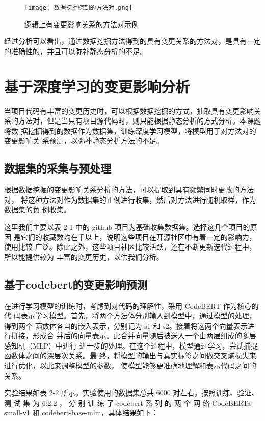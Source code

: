 \begin{figure}[h]
\centering
\texttt{[image: 数据挖掘挖到的方法对.png]}
\caption{逻辑上有变更影响关系的方法对示例}
\end{figure}


经过分析可以看出，通过数据挖掘方法得到的具有变更关系的方法对，是具有一定
的准确性的，并且可以弥补静态分析的不足。

\section{基于深度学习的变更影响分析}

当项目代码有丰富的变更历史时，可以根据数据挖掘的方式，抽取具有变更影响关
系的方法对，但是当只有项目源代码时，则只能根据静态分析的方式分析。本课题将数
据挖掘得到的数据作为数据集，训练深度学习模型，将模型用于对方法对的变更影响关
系预测，以弥补静态分析方法的不足。

\subsection{数据集的采集与预处理}

根据数据挖掘的变更影响关系分析的方法，可以提取到具有频繁同时更改的方法对，
将这种方法对作为数据集的正例进行收集，然后对方法进行随机取样，作为数据集的负
例收集。

这里我们主要以表 2-1 中的 github 项目为基础收集数据集。选择这几个项目的原因
是它们的收藏数均在千以上，说明这些项目在开源社区中有着一定的影响力，使用比较
广泛。除此之外，这些项目社区比较活跃，还在不断更新迭代过程中，所以能提供较为
丰富的变更历史，以供我们分析。

\subsection{基于codebert的变更影响预测}

在进行学习模型的训练时，考虑到对代码的理解性，采用 CodeBERT 作为核心的代
码表示学习模型。首先，将两个方法体分别输入到模型中，通过模型的处理，得到两个
函数体各自的嵌入表示，分别记为 s1 和 s2。接着将这两个向量表示进行拼接，形成合
并后的向量表示。此合并向量随后被送入一个由两层组成的多层感知机（MLP）中进行
进一步的处理。在这个过程中，模型通过学习，尝试捕捉函数体之间的深层次关系。最
终，将模型的输出与真实标签之间做交叉熵损失来进行优化，以此来调整模型的参数，
使模型能够更准确地理解和表示代码之间的关系。

实验结果如表 2-2 所示。实验使用的数据集总共 6000 对左右，按照训练、验证、测
试 集 为 6:2:2 ， 分 别 训 练 了 codebert 系 列 的 两 个 网 络 CodeBERTa-small-v1 和
codebert-base-mlm，具体结果如下：

